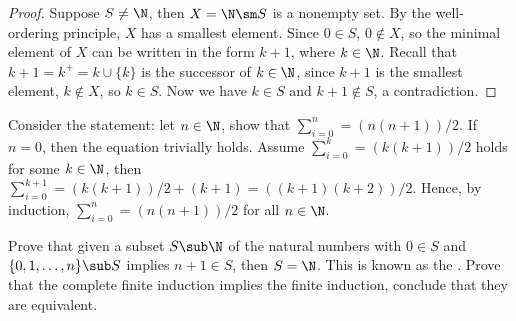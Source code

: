 \documentclass[10pt]{article}
\begin{document}
\begin{proof}
    Suppose $S\ne\N$, then $X=\N\sm S$ is a nonempty set. By the well-ordering principle, $X$ has a smallest element. Since $0\in S$, $0\notin X$, so the minimal element of $X$ can be written in the form $k+1$, where $k\in\N$. Recall that $k+1={k}^{+}=k\cup\{k\}$ is the successor of $k\in\N$, since $k+1$ is the smallest element, $k\notin X$, so $k\in S$. Now we have $k\in S$ and $k+1\notin S$, a contradiction.
\end{proof}
\begin{example}
    Consider the statement: let $n\in\N$, show that ${\sum}_{i=0}^{n}=(n(n+1))/2$. If $n=0$, then the equation trivially holds. Assume ${\sum}_{i=0}^{k}=(k(k+1))/2$ holds for some $k\in\N$, then ${\sum}_{i=0}^{k+1}=(k(k+1))/2+(k+1)=((k+1)(k+2))/2$. Hence, by induction, ${\sum}_{i=0}^{n}=(n(n+1))/2$ for all $n\in\N$.
\end{example}
\begin{problem}
    Prove that given a subset $S\sub\N$ of the natural numbers with $0\in S$ and $\{0,1,\dots,n\}\sub S$ implies $n+1\in S$, then $S=\N$. This is known as the . Prove that the complete finite induction implies the finite induction, conclude that they are equivalent.
\end{problem}
\end{document}
